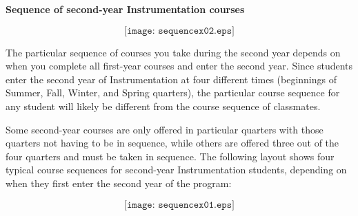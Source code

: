 


\centerline{\bf Sequence of second-year Instrumentation courses}

\vskip 10pt

$$\texttt{[image: sequencex02.eps]}$$  %

\filbreak

The particular sequence of courses you take during the second year depends on when you complete all first-year courses and enter the second year.  Since students enter the second year of Instrumentation at four different times (beginnings of Summer, Fall, Winter, and Spring quarters), the particular course sequence for any student will likely be different from the course sequence of classmates.

Some second-year courses are only offered in particular quarters with those quarters not having to be in sequence, while others are offered three out of the four quarters and must be taken in sequence.  The following layout shows four typical course sequences for second-year Instrumentation students, depending on when they first enter the second year of the program:

$$\texttt{[image: sequencex01.eps]}$$  %


\vfil

\eject


